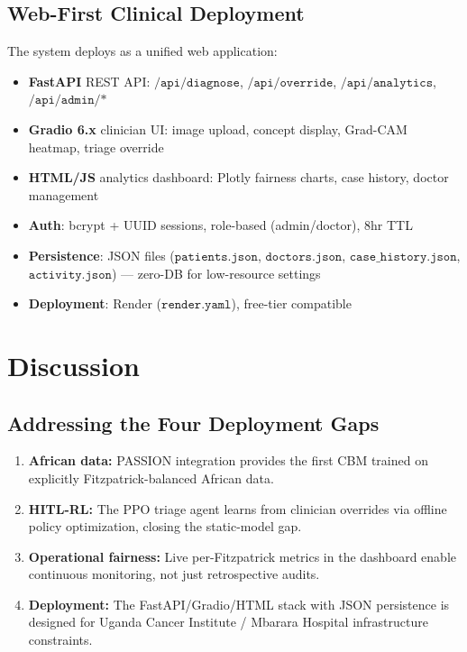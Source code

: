 \documentclass[12pt,a4paper]{article}
\begin{document}
\subsection{Web-First Clinical Deployment}
The system deploys as a unified web application:
\begin{itemize}
    \item \textbf{FastAPI} REST API: $\texttt{/api/diagnose}$, $\texttt{/api/override}$, $\texttt{/api/analytics}$, $\texttt{/api/admin/*}$
    \item \textbf{Gradio 6.x} clinician UI: image upload, concept display, Grad-CAM heatmap, triage override
    \item \textbf{HTML/JS} analytics dashboard: Plotly fairness charts, case history, doctor management
    \item \textbf{Auth}: bcrypt + UUID sessions, role-based (admin/doctor), 8hr TTL
    \item \textbf{Persistence}: JSON files ($\texttt{patients.json}$, $\texttt{doctors.json}$, $\texttt{case\_history.json}$, $\texttt{activity.json}$) — zero-DB for low-resource settings
    \item \textbf{Deployment}: Render ($\texttt{render.yaml}$), free-tier compatible
\end{itemize}

\section{Discussion}
\label{sec:discussion}

\subsection{Addressing the Four Deployment Gaps}
\begin{enumerate}
    \item \textbf{African data:} PASSION integration provides the first CBM trained on explicitly Fitzpatrick-balanced African data.
    \item \textbf{HITL-RL:} The PPO triage agent learns from clinician overrides via offline policy optimization, closing the static-model gap.
    \item \textbf{Operational fairness:} Live per-Fitzpatrick metrics in the dashboard enable continuous monitoring, not just retrospective audits.
    \item \textbf{Deployment:} The FastAPI/Gradio/HTML stack with JSON persistence is designed for Uganda Cancer Institute / Mbarara Hospital infrastructure constraints.
\end{enumerate}
\end{document}

